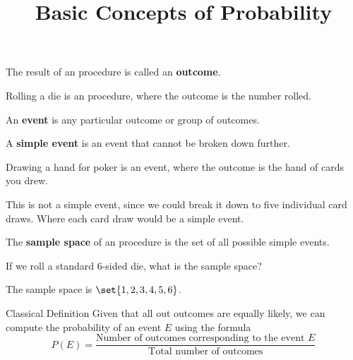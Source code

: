 \documentclass{beamer}
\title[MA205 - Section 4.1]{Basic Concepts of Probability}
\newcommand{\prob}[1]{P\left(#1\right)}
\begin{document}
\begin{frame}
\titlepage
\end{frame}

\begin{frame}
\begin{definition}
The result of an procedure is called an \textbf{outcome}.
\end{definition}\pause

\begin{example}
Rolling a die is an procedure, where the outcome is the number rolled.
\end{example}\pause

\begin{definition}
An \textbf{event} is any particular outcome or group of outcomes.

\vspace{2mm}
A \textbf{simple event} is an event that cannot be broken down further.
\end{definition}\pause

\begin{example}
Drawing a hand for poker is an event, where the outcome is the hand of cards you drew.

\vspace{2mm}
This is not a simple event, since we could break it down to five individual card draws. Where each card draw would be a simple event.
\end{example}
\end{frame}

\begin{frame}
\begin{definition}
The \textbf{sample space} of an procedure is the set of all possible simple events.
\end{definition}\pause

\begin{example}
If we roll a standard 6-sided die, what is the sample space?\pause

\vspace{2mm}
The sample space is $\set{1,2,3,4,5,6}$.
\end{example}\pause

\begin{block}{Classical Definition}
Given that all out outcomes are equally likely, we can compute the probability of an event $E$ using the formula
\begin{equation*}
\prob{E}=\dfrac{\text{Number of outcomes corresponding to the event $E$}}{\text{Total number of outcomes}}
\end{equation*}
\end{block}
\end{frame}
\end{document}
